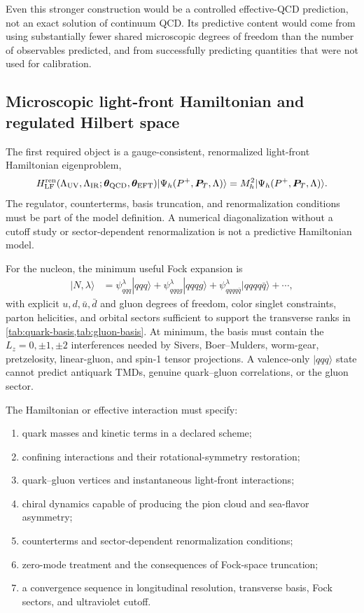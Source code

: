 \documentclass[11pt]{article}
\begin{document}
Even this stronger construction would be a controlled effective-QCD
prediction, not an exact solution of continuum QCD.  Its predictive content
would come from using substantially fewer shared microscopic degrees of
freedom than the number of observables predicted, and from successfully
predicting quantities that were not used for calibration.

\subsection{Microscopic light-front Hamiltonian and regulated Hilbert space}

The first required object is a gauge-consistent, renormalized light-front
Hamiltonian eigenproblem,
\begin{equation}
H_{\rm LF}^{\rm ren}(\Lambda_{\rm UV},\Lambda_{\rm IR};
\bm\theta_{\rm QCD},\bm\theta_{\rm EFT})
|\Psi_h(P^+,\bm P_T,\Lambda)\rangle
=M_h^2|\Psi_h(P^+,\bm P_T,\Lambda)\rangle .
\label{eq:lf-eigenproblem}
\end{equation}
The regulator, counterterms, basis truncation, and renormalization conditions
must be part of the model definition.  A numerical diagonalization without
a cutoff study or sector-dependent renormalization is not a predictive
Hamiltonian model.

For the nucleon, the minimum useful Fock expansion is
\begin{align}
|N,\lambda\rangle
&=\psi_{qqq}^{\lambda}|qqq\rangle
 +\psi_{qqqg}^{\lambda}|qqqg\rangle
 +\psi_{qqqq\bar q}^{\lambda}|qqqq\bar q\rangle
 +\cdots ,
\label{eq:nucleon-fock}
\end{align}
with explicit \(u,d,\bar u,\bar d\) and gluon degrees of freedom, color
singlet constraints, parton helicities, and orbital sectors sufficient to
support the transverse ranks in \cref{tab:quark-basis,tab:gluon-basis}.
At minimum, the basis must contain the \(L_z=0,\pm1,\pm2\) interferences
needed by Sivers, Boer--Mulders, worm-gear, pretzelosity, linear-gluon, and
spin-1 tensor projections.  A valence-only \(|qqq\rangle\) state cannot
predict antiquark TMDs, genuine quark--gluon correlations, or the gluon
sector.

The Hamiltonian or effective interaction must specify:
\begin{enumerate}
  \item quark masses and kinetic terms in a declared scheme;
  \item confining interactions and their rotational-symmetry restoration;
  \item quark--gluon vertices and instantaneous light-front interactions;
  \item chiral dynamics capable of producing the pion cloud and sea-flavor
  asymmetry;
  \item counterterms and sector-dependent renormalization conditions;
  \item zero-mode treatment and the consequences of Fock-space truncation;
  \item a convergence sequence in longitudinal resolution, transverse basis,
  Fock sectors, and ultraviolet cutoff.
\end{enumerate}
\end{document}
